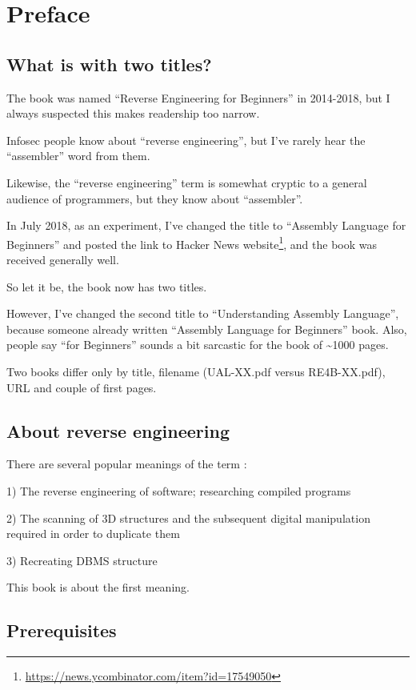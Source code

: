 \section*{Preface}

\subsection*{What is with two titles?}
\label{TwoTitles}

The book was named ``Reverse Engineering for Beginners'' in 2014-2018, but I always suspected this makes readership too narrow.

Infosec people know about ``reverse engineering'', but I've rarely hear the ``assembler'' word from them.

Likewise, the ``reverse engineering'' term is somewhat cryptic to a general audience of programmers, but they know about ``assembler''.

In July 2018, as an experiment, I've changed the title to ``Assembly Language for Beginners''
and posted the link to Hacker News website\footnote{\url{https://news.ycombinator.com/item?id=17549050}}, and the book was received generally well.

So let it be, the book now has two titles.

However, I've changed the second title to ``Understanding Assembly Language'', because someone already written ``Assembly Language for Beginners'' book.
Also, people say ``for Beginners'' sounds a bit sarcastic for the book of \textasciitilde{}1000 pages.

Two books differ only by title, filename (UAL-XX.pdf versus RE4B-XX.pdf), URL and couple of first pages.

\subsection*{About reverse engineering}

There are several popular meanings of the term :

1) The reverse engineering of software; researching compiled programs

2) The scanning of 3D structures and the subsequent digital manipulation required in order to duplicate them

3) Recreating \ac{DBMS} structure

This book is about the first meaning.

\subsection*{Prerequisites}

